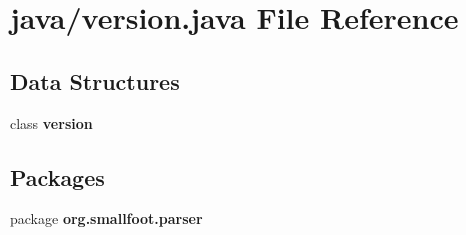 \section{java/version.java File Reference}
\label{version_8java}
\subsection*{Data Structures}
\begin{DoxyCompactItemize}
\item 
class {\bf version}
\end{DoxyCompactItemize}
\subsection*{Packages}
\begin{DoxyCompactItemize}
\item 
package {\bf org.\+smallfoot.\+parser}
\end{DoxyCompactItemize}
